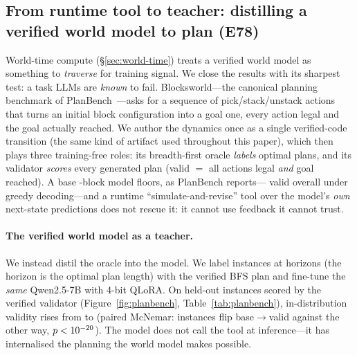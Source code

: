 \documentclass[11pt]{article}
\newcommand{\rev}[1]{{\color{revblue}#1}}
\begin{document}
\subsection{\texorpdfstring{\rev{From runtime tool to teacher: distilling a verified world model to plan (E78)}}{From runtime tool to teacher: distilling a verified world model to plan (E78)}}\label{sec:planbench}
\rev{World-time compute (\S\ref{sec:world-time}) treats a verified world model as something to
\emph{traverse} for training signal. We close the results with its sharpest test: a task LLMs
are \emph{known} to fail. Blocksworld---the canonical planning benchmark of
PlanBench~\cite{valmeekam2023planbench}---asks for a sequence of pick/stack/unstack actions that
turns an initial block configuration into a goal one, every action legal and the goal actually
reached. We author the dynamics once as a single verified-code transition (the same kind of
artifact used throughout this paper), which then plays three training-free roles: its
breadth-first oracle \emph{labels} optimal plans, and its validator \emph{scores} every
generated plan (valid $=$ all actions legal \emph{and} goal reached). A base \PlanBlocks-block
model floors, as PlanBench reports---\PlanBase{} valid overall under greedy decoding---and a
runtime ``simulate-and-revise'' tool over the model's \emph{own} next-state predictions does not
rescue it: it cannot use feedback it cannot trust.}

\rev{\paragraph{The verified world model as a teacher.} We instead distil the oracle into the
model. We label \PlanNTrain{} instances at horizons \PlanTrainHorizons{} (the horizon is the
optimal plan length) with the verified BFS plan and fine-tune the \emph{same} Qwen2.5-7B with
4-bit QLoRA. On \PlanNTest{} held-out instances scored by the verified validator
(Figure~\ref{fig:planbench}, Table~\ref{tab:planbench}), in-distribution validity rises from
\PlanBaseID{} to \PlanFTID{} (paired McNemar: \PlanFtOnly{} instances flip base$\to$valid against
\PlanBaseOnly{} the other way, $p<10^{-20}$). The model does not call the tool at
inference---it has internalised the planning the world model makes possible.}
\end{document}
